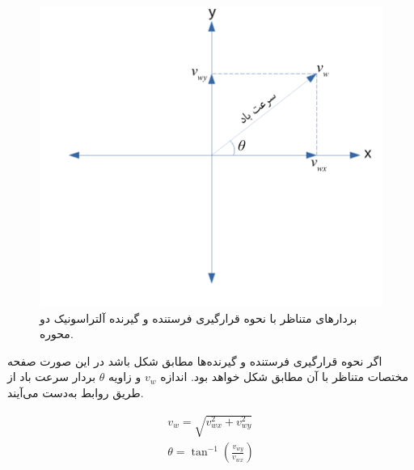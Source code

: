 \begin{figure}[!h]
	\centering
	\includegraphics[width=0.7\linewidth]{Assets/ultrasonic 2d axis.pdf}
	\caption{ بردار‌های متناظر با نحوه قرارگیری فرستنده و گیرنده آلتراسونیک دو محوره.}
	\label{fig:2dUltrasonicAxis}
\end{figure}

اگر نحوه قرارگیری فرستنده و گیرنده‌ها مطابق شکل  باشد در این صورت صفحه مختصات متناظر با آن مطابق شکل  خواهد بود. اندازه $v_w$ و زاویه $\theta$ بردار سرعت باد از طریق روابط  به‌دست می‌آیند.

\begin{equation}\label{eq:windSpeed}
\begin{split}
v_w = \sqrt{v_{wx}^2 + v_{wy}^2}\\
\theta = \tan^{-1}{\left( \frac{v_{wy}}{v_{wx}}\right)}
\end{split}	
\end{equation}

